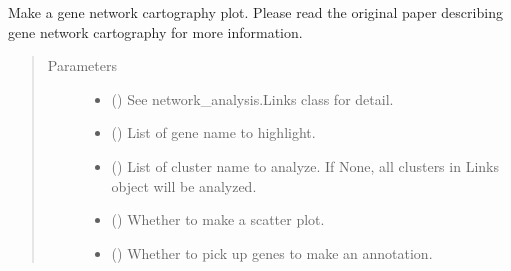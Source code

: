 \documentclass[letterpaper,10pt,english]{sphinxmanual}
\begin{document}
\begin{fulllineitems}
\begin{fulllineitems}
\end{fulllineitems}


\begin{fulllineitems}
\label{\detokenize{modules/celloracle:celloracle.Links.plot_cartography_scatter_per_cluster}}
Make a gene network cartography plot.
Please read the original paper describing gene network cartography for more information.
\begin{quote}\begin{description}
\item[{Parameters}] \leavevmode\begin{itemize}
\item {} 
 ({\hyperref[\detokenize{modules/celloracle:celloracle.Links}]{}}) \textendash{} See network\_analysis.Links class for detail.

\item {} 
 () \textendash{} List of gene name to highlight.

\item {} 
 () \textendash{} List of cluster name to analyze. If None, all clusters in Links object will be analyzed.

\item {} 
 () \textendash{} Whether to make a scatter plot.

\item {} 
 () \textendash{} Whether to pick up genes to make an annotation.


\end{itemize}
\end{description}
\end{quote}
\end{fulllineitems}
\end{fulllineitems}
\end{document}
